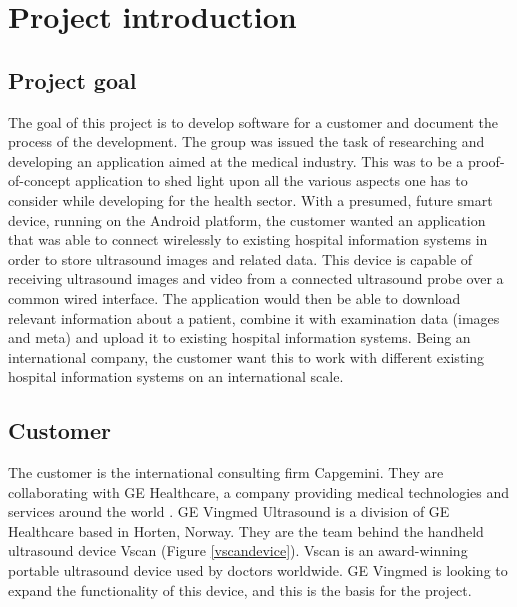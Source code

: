 \section{Project introduction}
\label{project_introduction}


\subsection{Project goal}
The goal of this project is to develop software for a customer and document the process of the development. The group was issued the task of researching and developing an application aimed at the medical industry. This was to be a proof-of-concept application to shed light upon all the various aspects one has to consider while developing for the health sector. With a presumed, future smart device, running on the Android platform, the customer wanted an application that was able to connect wirelessly to existing hospital information systems in order to store ultrasound images and related data. This device is capable of receiving ultrasound images and video from a connected ultrasound probe over a common wired interface. The application would then be able to download relevant information about a patient, combine it with examination data (images and meta) and upload it to existing hospital information systems. Being an international company, the customer want this to work with different existing hospital information systems on an international scale.

\subsection{Customer}
The customer is the international consulting firm Capgemini. They are collaborating with GE Healthcare, a company providing medical technologies and services around the world \cite{gehealthcare}. GE Vingmed Ultrasound is a division of GE Healthcare based in Horten, Norway. They are the team behind the handheld ultrasound device Vscan (Figure \ref{vscandevice}). Vscan is an award-winning \cite{vscan_awards} portable ultrasound device used by doctors worldwide. GE Vingmed is looking to expand the functionality of this device, and this is the basis for the project.

